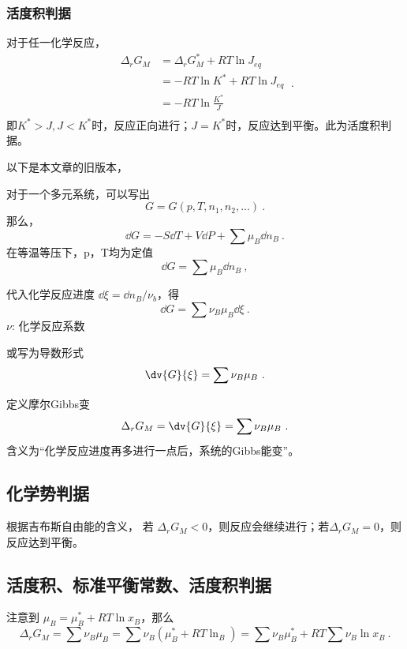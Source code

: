 \subsubsection{活度积判据}
对于任一化学反应，
$$
\begin{aligned}
\Delta_r G_M & = \Delta_r G_M^* + RT \ln J_{eq}\\
& = - RT \ln K^* + RT \ln J_{eq}\\
& = - RT \ln \frac{K^*}{J} \\
\end{aligned}~.
$$
即$K^*>J, J<K^*$时，反应正向进行；$J=K^*$时，反应达到平衡。此为活度积判据。

以下是本文章的旧版本，


对于一个多元系统，可以写出
\begin{equation}
G=G(p,T,n_1,n_2,...)~.
\end{equation}
那么，
\begin{equation}
\dd G=-S \dd T +V \dd P + \sum \mu_B \dd n_B~.
\end{equation}
在等温等压下，p，T均为定值
\begin{equation}
\dd G=\sum \mu_B \dd n_B~,
\end{equation}

代入化学反应进度 $\dd \xi=\dd n_B/\nu_b$，得
\begin{equation}
\dd G=\sum \nu_B \mu_B \dd \xi~.
\end{equation}
$\nu$: 化学反应系数

或写为导数形式
\begin{equation}
\dv{G}{\xi}=\sum \nu_B \mu_B~.
\end{equation}

定义摩尔Gibbs变
\begin{equation}
\Delta _r G_M = \dv{G}{\xi}=\sum \nu_B \mu_B~.
\end{equation}
含义为“化学反应进度再多进行一点后，系统的Gibbs能变”。

\subsection{化学势判据}
根据吉布斯自由能的含义，
若 $\Delta _r G_M<0$，则反应会继续进行；若$\Delta _r G_M = 0$，则反应达到平衡。

\subsection{活度积、标准平衡常数、活度积判据}
注意到 
$\mu_B=\mu_B^*+RT \ln x_B$，那么
\begin{equation} \label{eq_chemBl_1}
\Delta _r G_M =\sum \nu_B \mu_B = \sum \nu_B (\mu_B^*+RT\ln _B)=\sum \nu_B \mu_B^* + RT \sum \nu_B \ln x_B~.
\end{equation}

